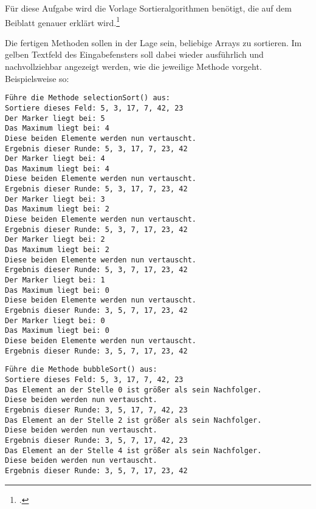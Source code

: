 \documentclass{bschlangaul-aufgabe}
\begin{document}

Für diese Aufgabe wird die Vorlage Sortieralgorithmen benötigt, die auf
dem Beiblatt genauer erklärt wird.\footcite[Aufgabenblatt 2: Rekursion,
Sortieren, Komplexität, Diese Aufgabe stammt aus dem Übungsblatt 1 zu
Algorithmen und Datenstrukturen von Prof. Dr. Martin Hennecke und Rainer
Gall an der Universität Würzburg und wurde dankenswerterweise zur
Verwendung in diesem Aufgabenblatt zur Verfügung gestellt, Aufgabe
2]{aud:ab:2}

Die fertigen Methoden sollen in der Lage sein, beliebige Arrays zu
sortieren. Im gelben Textfeld des Eingabefensters soll dabei wieder
ausführlich und nachvollziehbar angezeigt werden, wie die jeweilige
Methode vorgeht. Beispielsweise so:

{
\tiny
\begin{multicols}{2}
\begin{verbatim}
Führe die Methode selectionSort() aus:
Sortiere dieses Feld: 5, 3, 17, 7, 42, 23
Der Marker liegt bei: 5
Das Maximum liegt bei: 4
Diese beiden Elemente werden nun vertauscht.
Ergebnis dieser Runde: 5, 3, 17, 7, 23, 42
Der Marker liegt bei: 4
Das Maximum liegt bei: 4
Diese beiden Elemente werden nun vertauscht.
Ergebnis dieser Runde: 5, 3, 17, 7, 23, 42
Der Marker liegt bei: 3
Das Maximum liegt bei: 2
Diese beiden Elemente werden nun vertauscht.
Ergebnis dieser Runde: 5, 3, 7, 17, 23, 42
Der Marker liegt bei: 2
Das Maximum liegt bei: 2
Diese beiden Elemente werden nun vertauscht.
Ergebnis dieser Runde: 5, 3, 7, 17, 23, 42
Der Marker liegt bei: 1
Das Maximum liegt bei: 0
Diese beiden Elemente werden nun vertauscht.
Ergebnis dieser Runde: 3, 5, 7, 17, 23, 42
Der Marker liegt bei: 0
Das Maximum liegt bei: 0
Diese beiden Elemente werden nun vertauscht.
Ergebnis dieser Runde: 3, 5, 7, 17, 23, 42
\end{verbatim}

\begin{verbatim}
Führe die Methode bubbleSort() aus:
Sortiere dieses Feld: 5, 3, 17, 7, 42, 23
Das Element an der Stelle 0 ist größer als sein Nachfolger.
Diese beiden werden nun vertauscht.
Ergebnis dieser Runde: 3, 5, 17, 7, 42, 23
Das Element an der Stelle 2 ist größer als sein Nachfolger.
Diese beiden werden nun vertauscht.
Ergebnis dieser Runde: 3, 5, 7, 17, 42, 23
Das Element an der Stelle 4 ist größer als sein Nachfolger.
Diese beiden werden nun vertauscht.
Ergebnis dieser Runde: 3, 5, 7, 17, 23, 42
\end{verbatim}
\end{multicols}
}
\end{document}
